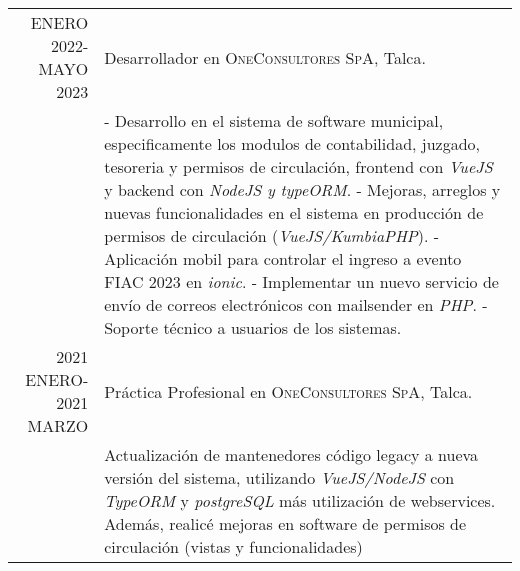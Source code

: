 \documentclass[a4paper,10pt]{article} %
\begin{document}
\begin{tabular}{r|p{11cm}}


\textsc{ENERO 2022-MAYO 2023} & Desarrollador en \textsc{OneConsultores SpA}, Talca. \emph{}\\
& \footnotesize{
    - Desarrollo en el sistema de software municipal, especificamente los modulos de contabilidad, juzgado, tesoreria y permisos de circulaci\'on, frontend con \textit{VueJS} y backend con \textit{NodeJS y typeORM}.\newline
    - Mejoras, arreglos y nuevas funcionalidades en el sistema en producci\'on de permisos de circulaci\'on (\textit{VueJS/KumbiaPHP}).\newline
    - Aplicaci\'on mobil para controlar el ingreso a evento FIAC 2023 en \textit{ionic}.\newline
    - Implementar un nuevo servicio de env\'io de correos electr\'onicos con mailsender en \textit{PHP}.\newline
    - Soporte t\'ecnico a usuarios de los sistemas.
}
\multicolumn{2}{c}{} \\


\textsc{2021 ENERO-2021 MARZO} & Pr\'actica Profesional en \textsc{OneConsultores SpA}, Talca. \emph{}\\
& \footnotesize{
    Actualizaci\'on de mantenedores c\'odigo legacy a nueva versi\'on del sistema, utilizando \textit{VueJS/NodeJS} con \textit{TypeORM} y \textit{postgreSQL} m\'as utilizaci\'on de webservices. Adem\'as, realic\'e mejoras en software de permisos de circulaci\'on (vistas y funcionalidades)
}
\multicolumn{2}{c}{} \\

\end{tabular}
\end{document}
